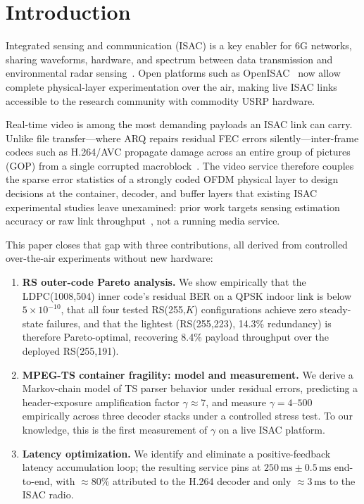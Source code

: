 \documentclass[conference]{IEEEtran}
\begin{document}
\section{Introduction}
\label{sec:intro}

Integrated sensing and communication (ISAC) is a key enabler for 6G networks, sharing waveforms, hardware, and spectrum between data transmission and environmental radar sensing~\cite{itu2023,liu2022isac,wei2023survey}. Open platforms such as OpenISAC~\cite{zhou2026openisac} now allow complete physical-layer experimentation over the air, making live ISAC links accessible to the research community with commodity USRP hardware.

Real-time video is among the most demanding payloads an ISAC link can carry. Unlike file transfer---where ARQ repairs residual FEC errors silently---inter-frame codecs such as H.264/AVC propagate damage across an entire group of pictures (GOP) from a single corrupted macroblock~\cite{wiegand2003h264}. The video service therefore couples the sparse error statistics of a strongly coded OFDM physical layer to design decisions at the container, decoder, and buffer layers that existing ISAC experimental studies leave unexamined: prior work targets sensing estimation accuracy or raw link throughput~\cite{zhou2026openisac,brunner2024bistatic}, not a running media service.

This paper closes that gap with three contributions, all derived from controlled over-the-air experiments without new hardware:
\begin{enumerate}
  \item \textbf{RS outer-code Pareto analysis.} We show empirically that the LDPC(1008,504) inner code's residual BER on a QPSK indoor link is below $5\times10^{-10}$, that all four tested RS(255,$K$) configurations achieve zero steady-state failures, and that the lightest (RS(255,223), 14.3\% redundancy) is therefore Pareto-optimal, recovering 8.4\% payload throughput over the deployed RS(255,191).

  \item \textbf{MPEG-TS container fragility: model and measurement.} We derive a Markov-chain model of TS parser behavior under residual errors, predicting a header-exposure amplification factor $\gamma\approx 7$, and measure $\gamma=4$--$500$ empirically across three decoder stacks under a controlled stress test. To our knowledge, this is the first measurement of $\gamma$ on a live ISAC platform.

  \item \textbf{Latency optimization.} We identify and eliminate a positive-feedback latency accumulation loop; the resulting service pins at $250\,\text{ms}\pm0.5\,\text{ms}$ end-to-end, with $\approx\!80\%$ attributed to the H.264 decoder and only $\approx\!3\,\text{ms}$ to the ISAC radio.
\end{enumerate}
\end{document}
